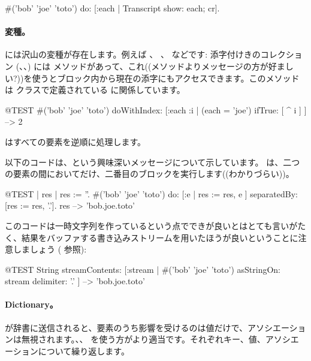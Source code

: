 \documentclass[a4paper,10pt,twoside]{book}
\begin{document}
\begin{code}{}
#('bob' 'joe' 'toto') do: [:each | Transcript show: each; cr].
\end{code}

\paragraph{変種。}  には沢山の変種が存在します。例えば 、 、  などです:
添字付けきのコレクション (、、) には  メソッドがあって、これ((メソッドよりメッセージの方が好ましい?))を使うとブロック内から現在の添字にもアクセスできます。このメソッドは  クラスで定義されている  に関係しています。

\begin{code}{@TEST}
#('bob' 'joe' 'toto') doWithIndex: [:each :i | (each = 'joe') ifTrue: [ ^ i ] ] --> 2
\end{code}

  はすべての要素を逆順に処理します。

以下のコードは、という興味深いメッセージについて示しています。
 は、二つの要素の間においてだけ、二番目のブロックを実行します((わかりづらい))。
\begin{code}{@TEST | res | }
res := ''.
#('bob' 'joe' 'toto') do: [:e | res := res, e ] separatedBy: [res := res, '.'].
res --> 'bob.joe.toto'
\end{code}
\noindent
このコードは一時文字列を作っているという点でできが良いとはとても言いがたく、結果をバッファする書き込みストリームを用いたほうが良いということに注意しましょう ( 参照):
\begin{code}{@TEST}
String streamContents: [:stream | #('bob' 'joe' 'toto') asStringOn: stream delimiter: '.' ] --> 'bob.joe.toto'
\end{code}



\paragraph{Dictionary。}
 が辞書に送信されると、要素のうち影響を受けるのは値だけで、アソシエーションは無視されます。、、  を使う方がより適当です。それぞれキー、値、アソシエーションについて繰り返します。
\end{document}
